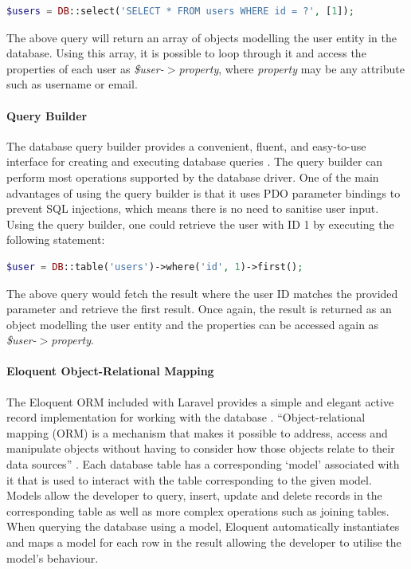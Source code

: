 \begin{lstlisting}[language=php]
    $users = DB::select('SELECT * FROM users WHERE id = ?', [1]);
\end{lstlisting}

The above query will return an array of objects modelling the user entity in the database. Using this array, it is possible to loop through it and access the properties of each user as \emph{\$user-$>$property}, where \emph{property} may be any attribute such as username or email.

\paragraph{Query Builder}
The database query builder provides a convenient, fluent, and easy-to-use interface for creating and executing database queries \cite{Laravel:QueryBuilder}. The query builder can perform most operations supported by the database driver. One of the main advantages of using the query builder is that it uses PDO parameter bindings to prevent SQL injections, which means there is no need to sanitise user input. Using the query builder, one could retrieve the user with ID 1 by executing the following statement:

\begin{lstlisting}[language=php]
    $user = DB::table('users')->where('id', 1)->first();
\end{lstlisting}

The above query would fetch the result where the user ID matches the provided parameter and retrieve the first result. Once again, the result is returned as an object modelling the user entity and the properties can be accessed again as \emph{\$user-$>$property}.

\paragraph{Eloquent Object-Relational Mapping}
The Eloquent ORM included with Laravel provides a simple and elegant active record implementation for working with the database \cite{Laravel:Eloquent}. ``Object-relational mapping (ORM) is a mechanism that makes it possible to address, access and manipulate objects without having to consider how those objects relate to their data sources'' \cite{TechTarget:ORM}. Each database table has a corresponding `model' associated with it that is used to interact with the table corresponding to the given model. Models allow the developer to query, insert, update and delete records in the corresponding table as well as more complex operations such as joining tables. When querying the database using a model, Eloquent automatically instantiates and maps a model for each row in the result allowing the developer to utilise the model's behaviour.

